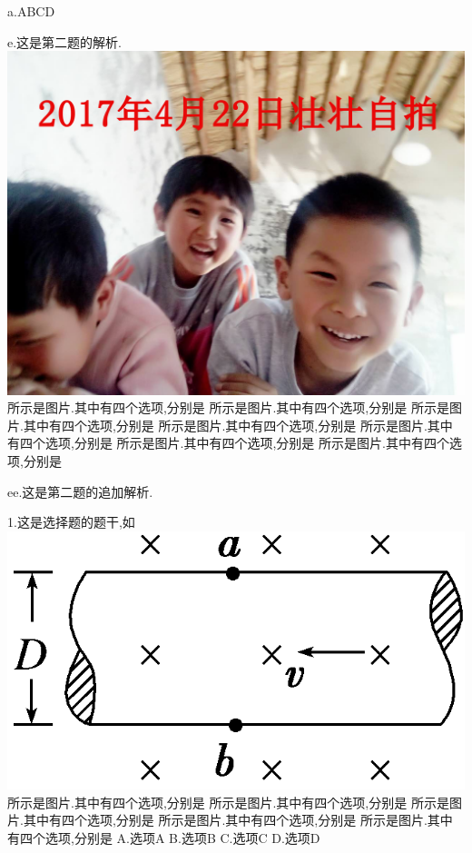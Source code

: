 \documentclass[a4paper,fontset = windows]{ctexbook}
\begin{document}
\begin{choices}[exp]
  a.ABCD

  e.这是第二题的解析.
  \includegraphics[scale=0.2]{2.jpg}
  所示是图片.其中有四个选项,分别是
  所示是图片.其中有四个选项,分别是
  所示是图片.其中有四个选项,分别是
  所示是图片.其中有四个选项,分别是
  所示是图片.其中有四个选项,分别是
  所示是图片.其中有四个选项,分别是
  所示是图片.其中有四个选项,分别是

  ee.这是第二题的追加解析.

  1.这是选择题的题干,如
  \includegraphics{1.png}
  所示是图片.其中有四个选项,分别是
  所示是图片.其中有四个选项,分别是
  所示是图片.其中有四个选项,分别是
  所示是图片.其中有四个选项,分别是
  所示是图片.其中有四个选项,分别是
  A.选项A
  B.选项B
  C.选项C
  D.选项D

\end{choices}
\end{document}
